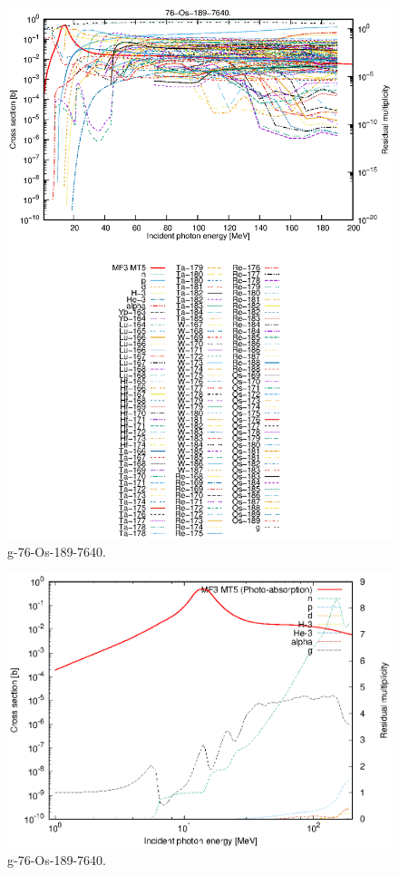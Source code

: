 \begin{figure}
 \includegraphics[width=\linewidth]{eps/g_76-Os-189_7640.eps}
  \caption{g-76-Os-189-7640.}
\end{figure}
\newpage \clearpage

\begin{figure}
 \includegraphics[width=\linewidth]{eps-log/g_76-Os-189_7640.eps}
 \caption{g-76-Os-189-7640.}
\end{figure}
\newpage \clearpage

